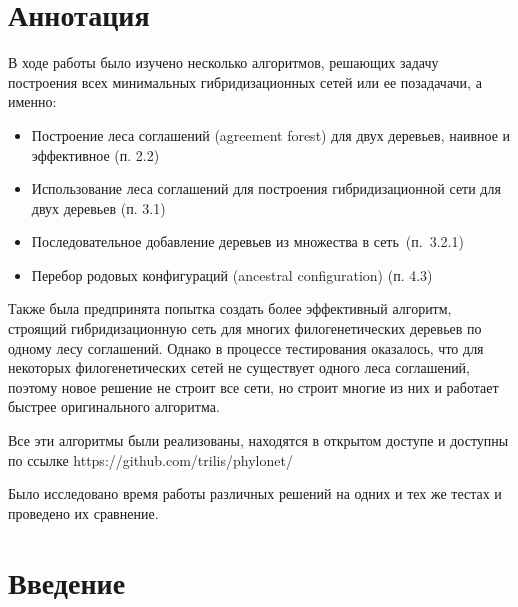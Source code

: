 \documentclass[14pt]{matmex-diploma-custom}
\newcommand{\stoptocwriting}{%
  \addtocontents{toc}{\protect\setcounter{tocdepth}{-5}}}
\newcommand{\resumetocwriting}{%
  \addtocontents{toc}{\protect\setcounter{tocdepth}{\arabic{tocdepth}}}}
\begin{document}
\maketitle
\stoptocwriting
\section*{Аннотация}
    В ходе работы было изучено несколько алгоритмов, решающих задачу построения
    всех минимальных гибридизационных сетей или ее позадачачи, а именно:
    \begin{itemize}
        \item Построение леса соглашений (agreement forest) для двух деревьев, наивное и эффективное (п. 2.2)
        \item Использование леса соглашений для построения гибридизационной сети для двух деревьев (п. 3.1)
        \item Последовательное добавление деревьев из множества в сеть~(п.~3.2.1)
        \item Перебор родовых конфигураций (ancestral configuration) (п. 4.3)
    \end{itemize}
    
    Также была предпринята попытка создать более эффективный алгоритм, строящий гибридизационную сеть для многих филогенетических деревьев по одному лесу соглашений. Однако в процессе тестирования оказалось, что для некоторых филогенетических сетей не существует одного леса соглашений, поэтому новое решение не строит все сети, но строит многие из них и работает быстрее оригинального алгоритма.
    
    Все эти алгоритмы были реализованы, находятся в открытом доступе и доступны по ссылке https://github.com/trilis/phylonet/
    
    Было исследовано время работы различных решений на одних и тех же тестах и проведено их сравнение.
\resumetocwriting
\tableofcontents
\section*{Введение}
\end{document}
